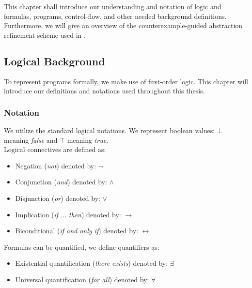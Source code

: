 
\begin{comment}
	This chapter is mostly focused on trace abstraction $\rightarrow$  It introduces the reader to the concept of trace abstraction. \\
	- Introduce logic, logical variables, terms, formulas, transition formulas with primed and unprimed variables, programs, program states, loops $\rightarrow$  then program-, error traces, feasible and infeasible counterexamples, CFGs, interpolants. \\ - From intuitive to true definitions. \\
	Here the running example from the introduction gets dissected to illustrate the definitions. \\ 
	Further the problems loops can cause are introduced, followed by a definition of loop summaries $\rightarrow$ introduction reflexive transitive closure of a formula 
	15 pages
\end{comment}

This chapter shall introduce our understanding and notation of logic and formulas, programs, control-flow, and other needed background definitions. Furthermore, we will give an overview of the \traceabstraction \cite{10.1007/978-3-642-03237-0_7} counterexample-guided abstraction refinement scheme used in \ultimate.

\subsection{Logical Background}
To represent programs formally, we make use of first-order logic. This chapter will introduce our definitions and notations used throughout this thesis.

\subsubsection{Notation}
We utilize the standard logical notations. We represent boolean values: $\bot$ meaning \textsl{false} and $\top$ meaning \textsl{true}. \\ Logical connectives are defined as:
\begin{itemize}
	\item Negation (\textsl{not}) denoted by: $\neg$
	\item Conjunction (\textsl{and}) denoted by: $\land$
	\item Disjunction (\textsl{or}) denoted by: $\lor$
	\item Implication (\textsl{if $\ldots$ then}) denoted by: $\rightarrow$
	\item Biconditional (\textsl{if and only if}) denoted by: $\leftrightarrow$
\end{itemize}
Formulas can be quantified, we define quantifiers as:
\begin{itemize}
	\item Existential quantification (\textsl{there exists}) denoted by: $\exists$
	\item Universal quantification (\textsl{for all}) denoted by: $\forall$
\end{itemize}

